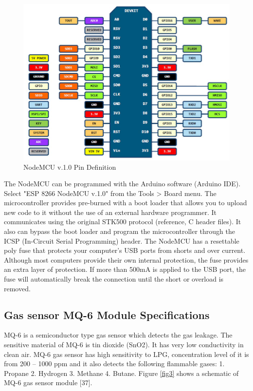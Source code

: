 \begin{figure}[t]
  \centering
  \includegraphics[width=6in]{2}
  \caption{NodeMCU v.1.0 Pin Definition}\label{fig2}
\vspace{.3in}
\end{figure}


The NodeMCU can be programmed with the Arduino software (Arduino IDE). Select "ESP 8266 NodeMCU v.1.0" from the Tools > Board menu. The microcontroller provides pre-burned with a boot loader that allows you to upload new code to it without the use of an external hardware programmer. It communicates using the original STK500 protocol (reference, C header files). It also can bypass the boot loader and program the microcontroller through the ICSP (In-Circuit Serial Programming) header. The NodeMCU has a resettable poly fuse that protects your computer's USB ports from shorts and over current. Although most computers provide their own internal protection, the fuse provides an extra layer of protection. If more than 500mA is applied to the USB port, the fuse will automatically break the connection until the short or overload is removed.\\
\vspace{.3in}
\subsection{Gas sensor MQ-6 Module Specifications}
MQ-6 is a semiconductor type gas sensor which detects the gas leakage. The sensitive material of MQ-6 is tin dioxide (SnO2). It has very low conductivity in clean air. MQ-6 gas sensor has high sensitivity to LPG, concentration level of it is from 200 – 1000 ppm and it also detects the following flammable gases: 1. Propane 2. Hydrogen 3. Methane 4. Butane. Figure \ref{fig3} shows a schematic of MQ-6 gas sensor module [37].\\


